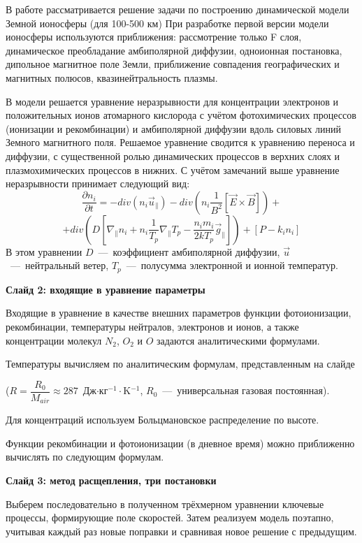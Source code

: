 \documentclass[2pt, a4paper, fleqn]{extarticle}
\begin{document}
В работе рассматривается решение задачи по построению динамической модели Земной ионосферы (для 100-500 км) При разработке первой версии модели ионосферы используются приближения: рассмотрение только F слоя, динамическое преобладание амбиполярной диффузии, одноионная постановка, дипольное магнитное поле Земли, приближение совпадения географических и магнитных полюсов, квазинейтральность плазмы.

В модели решается уравнение неразрывности для концентрации электронов и положительных ионов атомарного кислорода с учётом фотохимических процессов (ионизации и рекомбинации) и амбиполярной диффузии вдоль силовых линий Земного магнитного поля. Решаемое уравнение сводится к уравнению переноса и диффузии, с существенной ролью динамических процессов в верхних слоях и плазмохимических процессов в нижних. С учётом замечаний выше уравнение неразрывности принимает следующий вид:
$$\dfrac{\partial n_i}{\partial t} = -div(n_i \vec{u}_\parallel)-div\left(n_i\dfrac{1}{B^2}[\vec{E}\times \vec{B}] \right)+$$ $$+div\left(D\left[\nabla_\parallel n_i +n_i\dfrac{1}{T_p}\nabla_\parallel T_p - \dfrac{n_i m_i}{2kT_p}\vec{g}_\parallel\right]\right)+[P-k_in_i]$$ В этом уравнении $D$~---~коэффициент амбиполярной диффузии, $\vec{u}$~---~нейтральный ветер, $T_p$~---~полусумма электронной и ионной температур.

\medskip

{\bf Слайд 2: входящие в уравнение параметры}

Входящие в уравнение в качестве внешних параметров функции фотоионизации, рекомбинации, температуры нейтралов, электронов и ионов, а также концентрации молекул $N_2$, $O_2$ и $O$ задаются аналитическими формулами. 

Температуры вычисляем по аналитическим формулам, представленным на слайде 

($R=\dfrac{R_0}{M_{air}}\approx 287$~Дж$\cdot$кг$^{-1}\cdot$K$^{-1}$, $R_0$~---~универсальная газовая постоянная).

Для концентраций используем Больцмановское распределение по высоте.

Функции рекомбинации и фотоионизации (в дневное время) можно приближенно вычислять по следующим формулам.

\medskip

{\bf Слайд 3: метод расщепления, три постановки}

Выберем последовательно в полученном трёхмерном уравнении ключевые процессы, формирующие поле скоростей. Затем реализуем модель поэтапно, учитывая каждый раз новые поправки и сравнивая новое решение с предыдущим.
\end{document}
